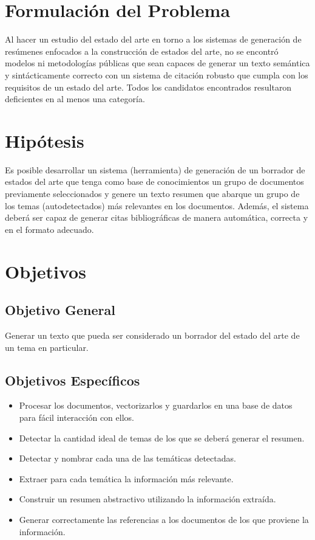 \section{Formulación del Problema}
    Al hacer un estudio del estado del arte en torno a los sistemas de generación de resúmenes enfocados a la construcción de estados del arte, no se encontró modelos ni metodologías públicas que sean capaces de generar un texto semántica y sintácticamente correcto con un sistema de citación robusto que cumpla con los requisitos de un estado del arte. Todos los candidatos encontrados resultaron deficientes en al menos una categoría.

\section{Hipótesis}
    Es posible desarrollar un sistema (herramienta) de generación de un borrador de estados del arte que tenga como base de conocimientos un grupo de documentos previamente seleccionados y genere un texto resumen que abarque un grupo de los temas (autodetectados) más relevantes en los documentos. Además, el sistema deberá ser capaz de generar citas bibliográficas de manera automática, correcta y en el formato adecuado.

\section{Objetivos}
    \subsection{Objetivo General}

        Generar un texto que pueda ser considerado un borrador del estado del arte de un tema en particular.

    \subsection{Objetivos Específicos}

        \begin{itemize}
            \item Procesar los documentos, vectorizarlos y guardarlos en una base de datos para fácil interacción con ellos.
            \item Detectar la cantidad ideal de temas de los que se deberá generar el resumen.
            \item Detectar y nombrar cada una de las temáticas detectadas.
            \item Extraer para cada temática la información más relevante.
            \item Construir un resumen abstractivo utilizando la información extraída.
            \item Generar correctamente las referencias a los documentos de los que proviene la información.

        \end{itemize}



